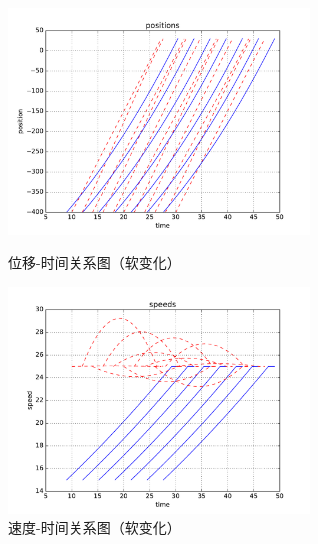 \begin{figure}[htbp]
\begin{minipage}{0.48\textwidth}
  \centering
  \includegraphics[height=6cm]{figures/sim_case4/posi.pdf}
  \caption{位移-时间关系图（软变化）}
  \label{fig:case4:posi}
\end{minipage}\hfill
\begin{minipage}{0.48\textwidth}
  \centering
  \includegraphics[height=6cm]{figures/sim_case4/speed.pdf}
  \caption{速度-时间关系图（软变化）}
  \label{fig:case4:speed}
\end{minipage}
\end{figure}
